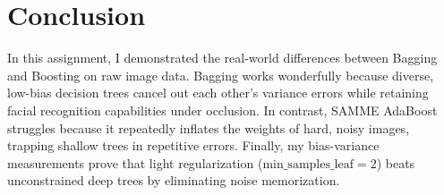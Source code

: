 \documentclass[10pt,twocolumn,letterpaper]{article}
\begin{document}
\section{Conclusion}
In this assignment, I demonstrated the real-world differences between Bagging and Boosting on raw image data. Bagging works wonderfully because diverse, low-bias decision trees cancel out each other's variance errors while retaining facial recognition capabilities under occlusion. In contrast, SAMME AdaBoost struggles because it repeatedly inflates the weights of hard, noisy images, trapping shallow trees in repetitive errors. Finally, my bias-variance measurements prove that light regularization ($\text{min\_samples\_leaf}=2$) beats unconstrained deep trees by eliminating noise memorization.
\end{document}
